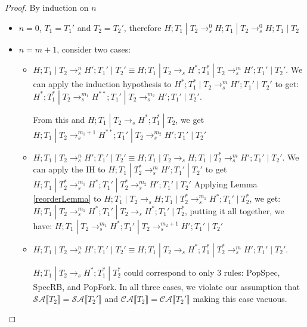 \documentclass[9pt]{article}
\newcommand\specStep{\rightarrow_{s}}
\newcommand{\specActions}[1]{\mathcal{SA} \llbracket #1 \rrbracket}
\newcommand{\commitActions}[1]{\mathcal{CA} \llbracket #1 \rrbracket}
\begin{document}
\begin{proof}
By induction on $n$ 
\begin{itemize}
\item $n = 0$, $T_1 = T_1'$ and $T_2 = T_2'$, therefore $H; T_1 \; | \; T_2 \specStep^0 H; T_1 \; | \; T_2 \specStep^0 H; T_1 \; | \; T_2$

\item $n = m+1$, consider two cases:

\begin{itemize}

\item $H; T_1 \; | \; T_2 \specStep^n H'; T_1' \; | \; T_2' \equiv H; T_1 \; | \; T_2 \specStep H^*; T_1^* \; | \; T_2 \specStep^m H'; T_1' \; | \; T_2'$.  We can apply the induction hypothesis to $H^*; T_1^* \; | \; T_2 \specStep^m H'; T_1' \; | \; T_2'$ to get: $H^*; T_1^* \; | \; T_2 \specStep^{m_1} H^{**}; T_1' \; | \; T_2 \specStep^{m_2} H'; T_1' \; | \; T_2'$.  

From this and $H; T_1 \; | \; T_2 \specStep H^*; T_1^* \; | \; T_2$, we get $H; T_1 \; | \; T_2  \specStep^{m_1+1} H^{**}; T_1' \; | \; T_2 \specStep^{m_2} H'; T_1' \; | \; T_2'$

\item $H; T_1 \; | \; T_2 \specStep^n H'; T_1' \; | \; T_2' \equiv H; T_1 \; | \; T_2 \specStep H; T_1 \; | \; T_2^* \specStep^m H'; T_1' \; | \; T_2'$. We can apply the IH to $H; T_1 \; | \; T_2^* \specStep^m H'; T_1' \; | \; T_2'$ to get $H; T_1 \; | \; T_2^* \specStep^{m_1} H^*; T_1' \; | \; T_2^* \specStep^{m_2} H'; T_1' \; | \; T_2'$
Applying Lemma \ref{reorderLemma} to $H; T_1 \; | \; T_2 \specStep H; T_1 \; | \; T_2^* \specStep^{m_1} H^*; T_1' \; | \; T_2^*$, we get: $H; T_1 \; | \; T_2 \specStep^{m_1} H^*; T_1' \; | \; T_2 \specStep H^*; T_1' \; | \; T_2^*$, putting it all together, we have: $H; T_1 \; | \; T_2 \specStep^{m_1} H^*; T_1' \; | \; T_2 \specStep^{m_2+1} H'; T_1' \; | \; T_2'$

\item $H; T_1 \; | \; T_2 \specStep^n H'; T_1' \; | \; T_2' \equiv H; T_1 \; | \; T_2 \specStep H^*; T_1^* \; | \; T_2^* \specStep^m H'; T_1' \; | \; T_2'$.  

$H; T_1 \; | \; T_2 \specStep H^*; T_1^* \; | \; T_2^*$ could correspond to only 3 rules: PopSpec, SpecRB, and PopFork.  In all three cases, we violate our assumption that $\specActions{T_2} = \specActions{T_2'}$ and $\commitActions{T_2} = \commitActions{T_2'}$ making this case vacuous. 

\end{itemize}

\end{itemize}


\end{proof}
\end{document}
